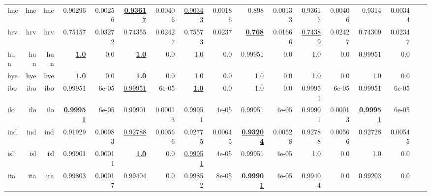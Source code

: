 \documentclass[11pt]{article}
\begin{document}
\begin{table*}[h]
{\begin{tabular}{lrrrrrrrrrrrrrrrr}
hne         & hne         & hne         & 0.90296         & 0.00256         & \textbf{\underline{0.93617}}         & 0.00406         & \underline{0.90343}         & 0.00186         & 0.898         & 0.00133         & 0.93617         & 0.00406         & 0.9314         & 0.00344         \\
hrv         & hrv         & hrv         & 0.75157         & 0.03272         & 0.74355         & 0.02427         & 0.75573         & 0.0237         & \textbf{\underline{0.768}}         & 0.01666         & \underline{0.74389}         & 0.02427         & 0.74309         & 0.02347         \\
hun         & hun         & hun         & \textbf{\underline{1.0}}         & 0.0         & \textbf{\underline{1.0}}         & 0.0         & 1.0         & 0.0         & 0.99951         & 0.0         & 1.0         & 0.0         & 0.99951         & 0.0         \\
hye         & hye         & hye         & \textbf{\underline{1.0}}         & 0.0         & \textbf{\underline{1.0}}         & 0.0         & 1.0         & 0.0         & 1.0         & 0.0         & 1.0         & 0.0         & 1.0         & 0.0         \\
ibo         & ibo         & ibo         & 0.99951         & 6e-05         & \underline{0.99951}         & 6e-05         & \textbf{\underline{1.0}}         & 0.0         & 1.0         & 0.0         & 0.99951         & 6e-05         & 0.99951         & 6e-05         \\
ilo         & ilo         & ilo         & \textbf{\underline{0.99951}}         & 6e-05         & 0.99901         & 0.00013         & 0.99951         & 4e-05         & 0.99951         & 4e-05         & 0.99901         & 0.00013         & \textbf{\underline{0.99951}}         & 6e-05         \\
ind         & ind         & ind         & 0.91929         & 0.00983         & \underline{0.92788}         & 0.00566         & 0.92775         & 0.00645         & \textbf{\underline{0.93204}}         & 0.00528         & 0.92788         & 0.00566         & 0.92728         & 0.00545         \\
isl         & isl         & isl         & 0.99901         & 0.00011         & \textbf{\underline{1.0}}         & 0.0         & \underline{0.99951}         & 4e-05         & 0.99951         & 4e-05         & 1.0         & 0.0         & 1.0         & 0.0         \\
ita         & ita         & ita         & 0.99803         & 0.00017         & \underline{0.99404}         & 0.0         & 0.99852         & 8e-05         & \textbf{\underline{0.99901}}         & 4e-05         & 0.99404         & 0.0         & 0.99203         & 0.0         \\

\end{tabular}}
\end{table*}
\end{document}
